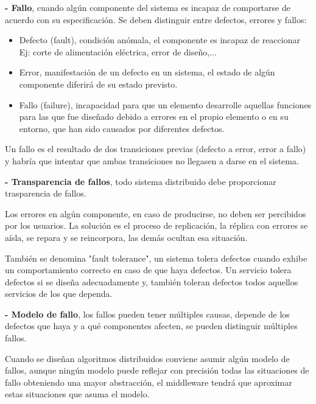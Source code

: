 \documentclass[12pt]{amsart}
\begin{document}
    \textbf{- Fallo}, cuando algún componente del sistema es incapaz de comportarse de acuerdo con su especificación. Se deben distinguir entre defectos, errores y fallos:
    
    \begin{itemize}
        \item Defecto (fault), condición anómala, el componente es incapaz de reaccionar Ej: corte de alimentación eléctrica, error de diseño,...
        \item Error, manifestación de un defecto en un sistema, el estado de algún componente diferirá de su estado previsto.
        \item Fallo (failure), incapacidad para que un elemento desarrolle aquellas funciones para las que fue diseñado debido a errores en el propio elemento o en su entorno, que han sido causados por diferentes defectos.
    \end{itemize}
    
    Un fallo es el resultado de dos transiciones previas (defecto a error, error a fallo) y habría que intentar que ambas transiciones no llegasen a darse en el sistema.
    
    \textbf{- Transparencia de fallos}, todo sistema distribuido debe proporcionar trasparencia de fallos. 
    
    Los errores en algún componente, en caso de producirse, no deben ser percibidos por los usuarios. La solución es el proceso de replicación, la réplica con errores se aísla, se repara y se reincorpora, las demás ocultan esa situación.
    
    También se denomina "fault tolerance", un sistema tolera defectos cuando exhibe un comportamiento correcto en caso de que haya defectos. Un servicio tolera defectos si se diseña adecuadamente y, también toleran defectos todos aquellos servicios de los que dependa.
    
    \textbf{- Modelo de fallo}, los fallos pueden tener múltiples causas, depende de los defectos que haya y a qué componentes afecten, se pueden distinguir múltiples fallos. 
    
    Cuando se diseñan algoritmos distribuidos conviene asumir algún modelo de fallos, aunque ningún modelo puede reflejar con precisión todas las situaciones de fallo obteniendo una mayor abstracción, el middleware tendrá que aproximar estas situaciones que asuma el modelo.
    
    
    
\end{document}
